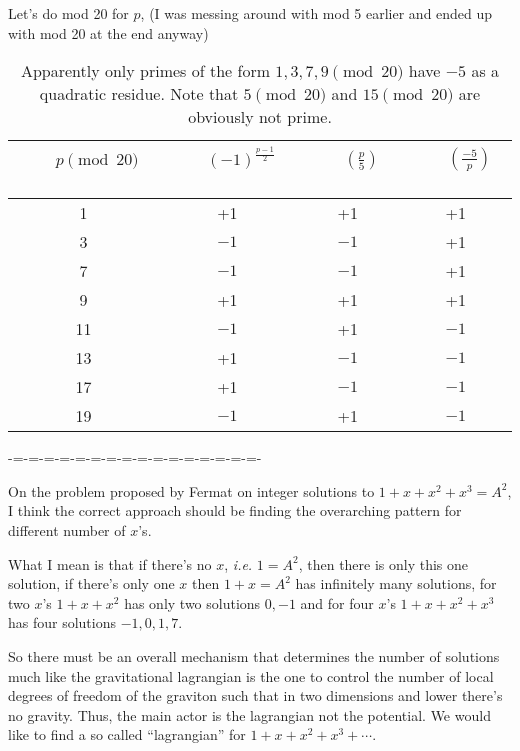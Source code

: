 \documentclass[aps,preprint,preprintnumbers,nofootinbib,showpacs,prd]{revtex4-1}
\newcommand{\ie}{{\it i.e.} }
\begin{document}
Let's do mod 20 for $p$, (I was messing around with mod 5 earlier and ended up with mod 20 at the end anyway)
%
\begin{table}[]
\centering
\caption{Apparently only primes of the form $1,3,7,9 \pmod{20}$ have $-5$ as a quadratic residue. Note that $5 \pmod{20}$ and $15 \pmod{20}$ are obviously not prime.}
\label{Tab:1}
\begin{tabular}{|c|c|c|c|}
\hline
~~~$p \pmod{20}$~~~ & ~~~$(-1)^{\frac{p-1}{2}}$~~~ & ~~~$\left(\frac{p}{5}\right)$~~~ & ~~~$\left(\frac{-5}{p}\right)$~~~  \\ \hline 
1 & +1 & +1 & +1 \\
3 & $-1$ & $-1$ & +1 \\
7 & $-1$ & $-1$ & +1 \\
9 & +1 & +1 & +1 \\
11 & $-1$ & +1 & $-1$ \\
13 & +1 & $-1$ & $-1$ \\
17 & +1 & $-1$ & $-1$ \\
19 & $-1$ & +1 & $-1$ \\
\hline
\end{tabular}
\end{table}
%







-=-=-=-=-=-=-=-=-=-=-=-=-=-=-=-=-

On the problem proposed by Fermat on integer solutions to $1 + x + x^2 + x^3 = A^2$, I think the correct approach should be finding the overarching pattern for different number of $x$'s.

What I mean is that if there's no $x$, \ie $1 = A^2$, then there is only this one solution, if there's only one $x$ then $1 + x = A^2$ has infinitely many solutions, for two $x$'s $1 + x + x^2$ has only two solutions $0, -1$ and for four $x$'s $1 + x + x^2 + x^3$ has four solutions $-1,0,1,7$.

So there must be an overall mechanism that determines the number of solutions much like the gravitational lagrangian is the one to control the number of local degrees of freedom of the graviton such that in two dimensions and lower there's no gravity. Thus, the main actor is the lagrangian not the potential. We would like to find a so called ``lagrangian'' for $1 + x + x^2 + x^3 + \cdots$.
\end{document}
